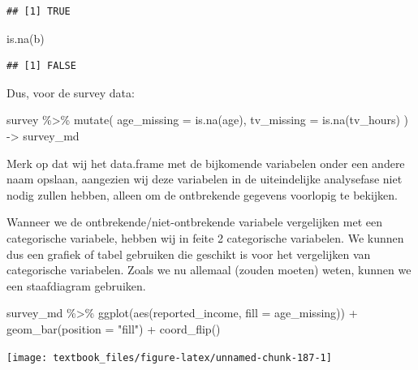 \documentclass[]{tufte-book}
\newenvironment{Shaded}{}{}
\newcommand{\AttributeTok}[1]{\textcolor[rgb]{0.49,0.56,0.16}{#1}}
\newcommand{\FunctionTok}[1]{\textcolor[rgb]{0.02,0.16,0.49}{#1}}
\newcommand{\NormalTok}[1]{#1}
\newcommand{\OtherTok}[1]{\textcolor[rgb]{0.00,0.44,0.13}{#1}}
\newcommand{\SpecialCharTok}[1]{\textcolor[rgb]{0.25,0.44,0.63}{#1}}
\newcommand{\StringTok}[1]{\textcolor[rgb]{0.25,0.44,0.63}{#1}}
\begin{document}
\begin{verbatim}
## [1] TRUE
\end{verbatim}

\begin{Shaded}
\begin{Highlighting}[]
\FunctionTok{is.na}\NormalTok{(b)}
\end{Highlighting}
\end{Shaded}

\begin{verbatim}
## [1] FALSE
\end{verbatim}

Dus, voor de survey data:

\begin{Shaded}
\begin{Highlighting}[]
\NormalTok{survey }\SpecialCharTok{\%\textgreater{}\%}
  \FunctionTok{mutate}\NormalTok{(}
    \AttributeTok{age\_missing =} \FunctionTok{is.na}\NormalTok{(age),}
    \AttributeTok{tv\_missing =} \FunctionTok{is.na}\NormalTok{(tv\_hours)}
\NormalTok{  ) }\OtherTok{{-}\textgreater{}}\NormalTok{ survey\_md}
\end{Highlighting}
\end{Shaded}

Merk op dat wij het data.frame met de bijkomende variabelen onder een andere naam opslaan, aangezien wij deze variabelen in de uiteindelijke analysefase niet nodig zullen hebben, alleen om de ontbrekende gegevens voorlopig te bekijken.

Wanneer we de ontbrekende/niet-ontbrekende variabele vergelijken met een categorische variabele, hebben wij in feite 2 categorische variabelen. We kunnen dus een grafiek of tabel gebruiken die geschikt is voor het vergelijken van categorische variabelen. Zoals we nu allemaal (zouden moeten) weten, kunnen we een staafdiagram gebruiken.

\begin{Shaded}
\begin{Highlighting}[]
\NormalTok{survey\_md }\SpecialCharTok{\%\textgreater{}\%}
  \FunctionTok{ggplot}\NormalTok{(}\FunctionTok{aes}\NormalTok{(reported\_income, }\AttributeTok{fill =}\NormalTok{ age\_missing)) }\SpecialCharTok{+}
  \FunctionTok{geom\_bar}\NormalTok{(}\AttributeTok{position =} \StringTok{"fill"}\NormalTok{) }\SpecialCharTok{+}
  \FunctionTok{coord\_flip}\NormalTok{()}
\end{Highlighting}
\end{Shaded}

\texttt{[image: textbook\_files/figure-latex/unnamed-chunk-187-1]}
\end{document}
